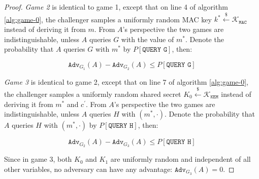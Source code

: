\documentclass[floatrow,journal=tches,submission]{iacrtrans}
\newcommand{\kem}{\texttt{KEM}}
\newcommand{\mac}{\texttt{MAC}}
\newcommand{\leftsample}{\stackrel{\$}{\leftarrow}}
\newcommand{\adv}{\texttt{Adv}}
\begin{document}
\begin{proof}
    \emph{Game 2} is identical to game 1, except that on line 4 of algorithm \ref{alg:game-0}, the challenger samples a uniformly random MAC key $k^\ast \leftsample \mathcal{K}_\mac$ instead of deriving it from $m$. From $A$'s perspective the two games are indistinguishable, unless $A$ queries $G$ with the value of $m^\ast$. Denote the probability that $A$ queries $G$ with $m^\ast$ by $P[\texttt{QUERY G}]$, then:

    \begin{equation*}
        \adv_{G_1}(A) - \adv_{G_2}(A) \leq P\left[\texttt{QUERY G}\right]
    \end{equation*}

    \emph{Game 3} is identical to game 2, except that on line 7 of algorithm \ref{alg:game-0}, the challenger samples a uniformly random shared secret $K_0 \leftsample \mathcal{K}_\kem$ instead of deriving it from $m^\ast$ and $c^\prime$. From $A$'s perspective the two games are indistinguishable, unless $A$ queries $H$ with $(m^\ast, \cdot)$. Denote the probability that $A$ queries $H$ with $(m^\ast, \cdot)$ by $P[\texttt{QUERY H}]$, then:

    \begin{equation*}
        \adv_{G_2}(A) - \adv_{G_3}(A) \leq P\left[\texttt{QUERY H}\right]
    \end{equation*}

    Since in game 3, both $K_0$ and $K_1$ are uniformly random and independent of all other variables, no adversary can have any advantage: $\adv_{G_3}(A) = 0$.


\end{proof}
\end{document}
